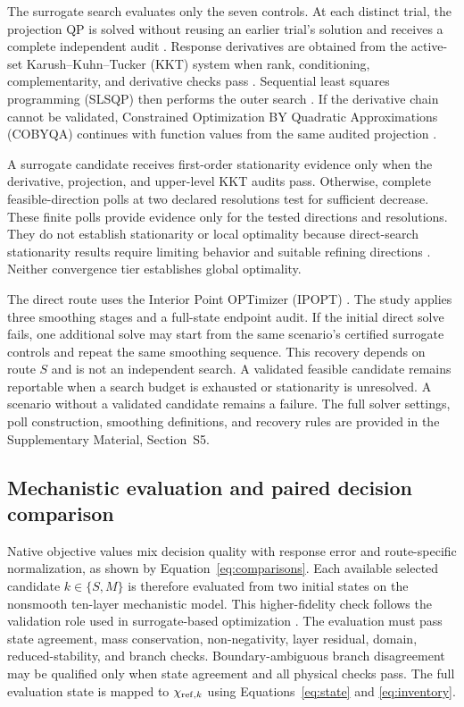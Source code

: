 \documentclass[a4paper,fleqn]{cas-sc}
\begin{document}
The surrogate search evaluates only the seven controls. At each distinct trial, the projection QP is solved without reusing an earlier trial's solution and receives a complete independent audit \citep{Stellato2020,Boyd2004}. Response derivatives are obtained from the active-set Karush--Kuhn--Tucker (KKT) system when rank, conditioning, complementarity, and derivative checks pass \citep{Tondel2003}. Sequential least squares programming (SLSQP) then performs the outer search \citep{Kraft1988}. If the derivative chain cannot be validated, Constrained Optimization BY Quadratic Approximations (COBYQA) continues with function values from the same audited projection \citep{Ragonneau2022}.

A surrogate candidate receives first-order stationarity evidence only when the derivative, projection, and upper-level KKT audits pass. Otherwise, complete feasible-direction polls at two declared resolutions test for sufficient decrease. These finite polls provide evidence only for the tested directions and resolutions. They do not establish stationarity or local optimality because direct-search stationarity results require limiting behavior and suitable refining directions \citep{AudetDennis2006}. Neither convergence tier establishes global optimality.

The direct route uses the Interior Point OPTimizer (IPOPT) \citep{WachterBiegler2006}. The study applies three smoothing stages and a full-state endpoint audit. If the initial direct solve fails, one additional solve may start from the same scenario's certified surrogate controls and repeat the same smoothing sequence. This recovery depends on route $S$ and is not an independent search. A validated feasible candidate remains reportable when a search budget is exhausted or stationarity is unresolved. A scenario without a validated candidate remains a failure. The full solver settings, poll construction, smoothing definitions, and recovery rules are provided in the Supplementary Material, Section~S5.

\subsection{Mechanistic evaluation and paired decision comparison}

Native objective values mix decision quality with response error and route-specific normalization, as shown by Equation~\eqref{eq:comparisons}. Each available selected candidate $k\in\{S,M\}$ is therefore evaluated from two initial states on the nonsmooth ten-layer mechanistic model. This higher-fidelity check follows the validation role used in surrogate-based optimization \citep{Bhosekar2018}. The evaluation must pass state agreement, mass conservation, non-negativity, layer residual, domain, reduced-stability, and branch checks. Boundary-ambiguous branch disagreement may be qualified only when state agreement and all physical checks pass. The full evaluation state is mapped to $\chi_{{\rm ref},k}$ using Equations~\eqref{eq:state} and \eqref{eq:inventory}.
\end{document}
